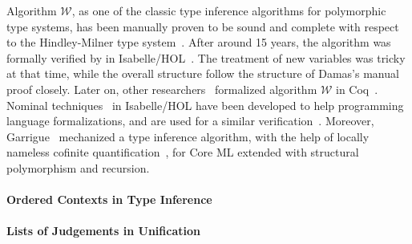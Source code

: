 Algorithm $\mathcal{W}$,
as one of the classic type inference algorithms for polymorphic type systems,
has been manually proven to be sound and complete
with respect to the Hindley-Milner type system~\cite{}.
After around 15 years, the algorithm was formally verified by
\citet{naraschewski1999type} in Isabelle/HOL~\cite{nipkow2002isabelle}.
The treatment of new variables was tricky at that time, while the overall structure follow the
structure of Damas's manual proof closely.
Later on, other researchers~\cite{dubois2000proving,dubois1999certification}
formalized algorithm $\mathcal{W}$ in Coq~\cite{Coq}.
Nominal techniques~\cite{urban2008nominalTech} in Isabelle/HOL have been
developed to help programming language formalizations, and are used for a similar
verification~\cite{urban2008nominal}. Moreover, Garrigue~\cite{garrigue2015certified}
mechanized a type inference algorithm,
with the help of locally nameless cofinite quantification~\cite{},
for Core ML extended with structural polymorphism and recursion.

\paragraph{Ordered Contexts in Type Inference}

\paragraph{Lists of Judgements in Unification}


